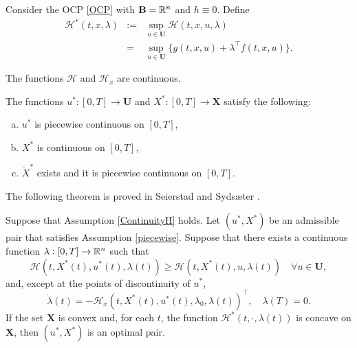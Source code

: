 Consider the OCP \eqref{OCP} with $\mathbf{B}=\mathbb{R}^n$ and $h\equiv 0$. Define
\begin{eqnarray*}
\mathcal{H}^\ast(t,x,\lambda) & := & \sup_{u\in\mathbf{U}}\mathcal{H}(t,x,u,\lambda)\\
     & = & \sup_{u\in\mathbf{U}}\{g(t,x,u) + \lambda^\top f(t,x,u)\}.    
\end{eqnarray*}

\begin{assumption}\label{ContinuityH}\rm The functions $\mathcal{H}$ and $\mathcal{H}_x$ are continuous. 
\end{assumption}


\begin{assumption}\label{piecewise}\rm The functions $u^\ast:[0,T]\to\mathbf{U}$ and $X^\ast:[0,T]\to\mathbf{X}$ satisfy the following:
\begin{enumerate}[(a)]
    \item $u^\ast$ is piecewise continuous on $[0,T]$,
    \item $X^\ast$ is continuous on $[0,T]$, 
    \item $\dot{X}^\ast$ exists and it is piecewise  continuous on $[0,T]$.
\end{enumerate}
\end{assumption}


The following theorem is proved in Seierstad and Syds\ae ter 
\cite[Theorem 3]{SeiSyd77}.  

\begin{theorem}\label{SufficientCond} Suppose that Assumption \ref{ContinuityH} 
  holds. Let $(u^\ast,X^\ast)$ be an admissible pair that satisfies Assumption 
  \ref{piecewise}. Suppose that there exists a continuous function 
  $\lambda:[0,T]\to \mathbb{R}^n$ such that 
   \begin{equation}
       \mathcal{H}(t,X^\ast(t),u^\ast(t),\lambda(t)) \geq
       \mathcal{H}(t,X^\ast(t),u,\lambda(t)) \quad \forall u\in\mathbf{U},
   \end{equation}
and, except at the points of discontinuity of $u^\ast$,
    \begin{equation}
         \dot{\lambda}(t) = 
         -\mathcal{H}_x(t,X^\ast(t),u^\ast(t),\lambda_0,\lambda(t))^\top, \quad 
         \lambda(T)=0.
    \end{equation}
  If the set $\mathbf{X}$ is convex and, for each $t$, the function 
  $\mathcal{H}^\ast(t,\cdot,\lambda(t))$ is concave on $\mathbf{X}$, then 
  $(u^\ast,X^\ast)$ is an optimal pair.
\end{theorem}
